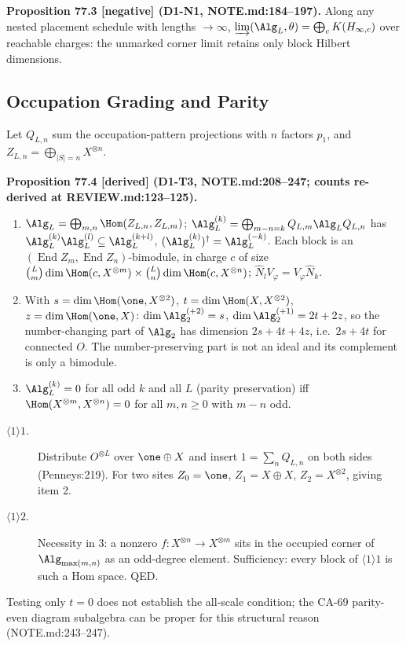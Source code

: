 \textbf{Proposition 77.3 [negative] (D1-N1, NOTE.md:184--197).}  Along any
nested placement schedule with lengths \(\to\infty\),
\(\varinjlim(\Alg_L,\theta)=\bigoplus_cK(H_{\infty,c})\) over reachable charges:
the unmarked corner limit retains only block Hilbert dimensions.

\subsection{Occupation Grading and Parity}

Let \(Q_{L,n}\) sum the occupation-pattern projections with \(n\) factors
\(p_1\), and \(Z_{L,n}=\bigoplus_{|S|=n}X^{\otimes n}\).

\textbf{Proposition 77.4 [derived] (D1-T3, NOTE.md:208--247; counts
re-derived at REVIEW.md:123--125).}
\begin{enumerate}
\item \(\Alg_L=\bigoplus_{m,n}\Hom(Z_{L,n},Z_{L,m})\);
\(\Alg_L^{(k)}=\bigoplus_{m-n=k}Q_{L,m}\Alg_LQ_{L,n}\) has
\(\Alg_L^{(k)}\Alg_L^{(l)}\subseteq\Alg_L^{(k+l)}\), \((\Alg_L^{(k)})^\dagger=\Alg_L^{(-k)}\).
Each block is an \((\operatorname{End}Z_m,\operatorname{End}Z_n)\)-bimodule, in charge \(c\)
of size \(\binom Lm\dim\Hom(c,X^{\otimes m})\times\binom Ln\dim\Hom(c,X^{\otimes n})\);
\(\hat N_lV_\varphi=V_\varphi\hat N_k\).
\item With \(s=\dim\Hom(\one,X^{\otimes2})\), \(t=\dim\Hom(X,X^{\otimes2})\),
\(z=\dim\Hom(\one,X)\): \(\dim\Alg_2^{(+2)}=s\),
\(\dim\Alg_2^{(+1)}=2t+2z\), so the number-changing part of \(\Alg_2\) has
dimension \(2s+4t+4z\), i.e.\ \(2s+4t\) for connected \(O\).  The
number-preserving part is not an ideal and its complement is only a bimodule.
\item \(\Alg_L^{(k)}=0\) for all odd \(k\) and all \(L\) (parity preservation) iff
\(\Hom(X^{\otimes m},X^{\otimes n})=0\) for all \(m,n\ge0\) with \(m-n\) odd.
\end{enumerate}
\begin{description}
\item[$\langle1\rangle1$.] Distribute \(O^{\otimes L}\) over \(\one\oplus X\) and
insert \(1=\sum_nQ_{L,n}\) on both sides (Penneys:219).  For two sites
\(Z_0=\one\), \(Z_1=X\oplus X\), \(Z_2=X^{\otimes2}\), giving item 2.
\item[$\langle1\rangle2$.] Necessity in 3: a nonzero \(f:X^{\otimes n}\to X^{\otimes m}\)
sits in the occupied corner of \(\Alg_{\max(m,n)}\) as an odd-degree element.
Sufficiency: every block of $\langle1\rangle1$ is such a Hom space. QED.
\end{description}
Testing only \(t=0\) does not establish the all-scale condition; the CA-69
parity-even diagram subalgebra can be proper for this structural reason
(NOTE.md:243--247).

